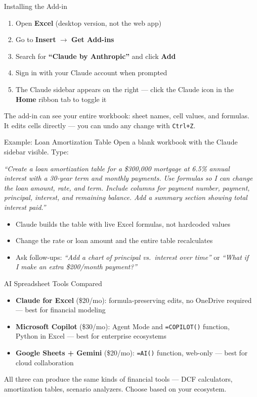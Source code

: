 \documentclass[aspectratio=169]{beamer}
\begin{document}
\begin{frame}{Installing the Add-in}
\begin{enumerate}
  \item Open \textbf{Excel} (desktop version, not the web app)
  \item Go to \textbf{Insert} $\rightarrow$ \textbf{Get Add-ins}
  \item Search for \textbf{``Claude by Anthropic''} and click \textbf{Add}
  \item Sign in with your Claude account when prompted
  \item The Claude sidebar appears on the right --- click the Claude icon in the \textbf{Home} ribbon tab to toggle it
\end{enumerate}
\vspace{0.3cm}
The add-in can see your entire workbook: sheet names, cell values, and formulas.  It edits cells directly --- you can undo any change with \texttt{Ctrl+Z}.
\end{frame}

\begin{frame}{Example: Loan Amortization Table}
Open a blank workbook with the Claude sidebar visible.  Type:
\vspace{0.2cm}
\begin{shadedbox}
\small\textit{``Create a loan amortization table for a \$300{,}000 mortgage at 6.5\% annual interest with a 30-year term and monthly payments.  Use formulas so I can change the loan amount, rate, and term.  Include columns for payment number, payment, principal, interest, and remaining balance.  Add a summary section showing total interest paid.''}
\end{shadedbox}
\vspace{0.2cm}
\begin{itemize}\small
  \item Claude builds the table with \alert{live Excel formulas}, not hardcoded values
  \item Change the rate or loan amount and the entire table recalculates
  \item Ask follow-ups: \textit{``Add a chart of principal vs.\ interest over time''} or \textit{``What if I make an extra \$200/month payment?''}
\end{itemize}
\end{frame}

\begin{frame}{AI Spreadsheet Tools Compared}
\begin{itemize}
  \item \textbf{Claude for Excel} (\$20/mo): formula-preserving edits, no OneDrive required --- best for financial modeling
  \item \textbf{Microsoft Copilot} (\$30/mo): Agent Mode and \texttt{=COPILOT()} function, Python in Excel --- best for enterprise ecosystems
  \item \textbf{Google Sheets + Gemini} (\$20/mo): \texttt{=AI()} function, web-only --- best for cloud collaboration
\end{itemize}
\vspace{0.3cm}
All three can produce the same kinds of financial tools --- DCF calculators, amortization tables, scenario analyzers.  Choose based on your ecosystem.
\end{frame}
\end{document}
